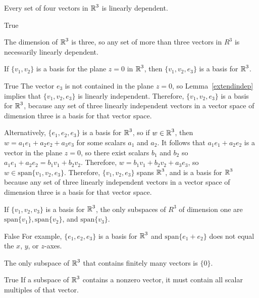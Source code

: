 \documentclass{ximera}
\begin{document}
\begin{exercise}  \label{A5.6.5}
Every set of four vectors in $\mbox{$\Bbb{R}$}^3$ is linearly dependent.
\begin{solution}
\ans True

\soln
The dimension of $\mbox{$\Bbb{R}$}^3$ is three, so any set of more than three vectors in $R^3$ is necessarily linearly dependent.
\end{solution}
\end{exercise}

\begin{exercise}  \label{A5.6.6}
If $\{v_1,v_2\}$ is a basis for the plane $z = 0$ in $\mbox{$\Bbb{R}$}^3$, then $\{v_1,v_2,e_3\}$ is a basis for $\mbox{$\Bbb{R}$}^3$.
\begin{solution}
\ans True
\soln
The vector $e_3$ is not contained in the plane $z=0$, so Lemma~\ref{extendindep} implies that $\{v_1,v_2,e_3\}$  is linearly independent. Therefore, $\{v_1,v_2,e_3\}$  is a basis for $\mbox{$\Bbb{R}$}^3$, because any set of three linearly independent vectors in a vector space of dimension three is a basis for that vector space. 

Alternatively, $\{e_1,e_2,e_3\}$ is a basis for $\mbox{$\Bbb{R}$}^3$, so if $w\in \mbox{$\Bbb{R}$}^3$, then $w = a_1 e_1 +a_2 e_2 +a_3 e_3$ for some scalars $a_1$ and $a_2$. It follows that $a_1 e_1 + a_2 e_2$ is a vector in the plane $z=0$, so there exist scalars $b_1$ and $b_2$ so $a_1 e_1+ a_2 e_2 = b_1 v_1 +b_2 v_2$. Therefore, $w = b_1 v_1 + b_2 v_2 + a_3 e_3$, so $w\in \text{span}\{v_1,v_2,e_3\}$. Therefore, $\{v_1,v_2,e_3\}$ spans $\mbox{$\Bbb{R}$}^3$, and is a basis for $\mbox{$\Bbb{R}$}^3$ because any set of three linearly independent vectors in a vector space of dimension three is a basis for that vector space. 
\end{solution}
\end{exercise}

\begin{exercise}  \label{A5.6.7}
If $\{v_1,v_2,v_3\}$ is a basis for $\mbox{$\Bbb{R}$}^3$, the only subspaces of $R^3$ of dimension one are $\text{span}\{v_1\}, \text{span}\{v_2\}$, and $\text{span}\{v_3\}$. 
\begin{solution}
\ans False 
\soln For example, $\{e_1,e_2,e_3\}$ is a basis for $\mbox{$\Bbb{R}$}^3$ and $\text{span}\{e_1+e_2\}$ does not equal the $x$, $y$, or $z$-axes.
\end{solution}
\end{exercise}

\begin{exercise}  \label{A5.6.8}
The only subspace of $\mbox{$\Bbb{R}$}^3$ that contains finitely many vectors is $\{ 0 \}$.
\begin{solution}
\ans True
\soln If a subspace of $\mbox{$\Bbb{R}$}^3$ contains a nonzero vector, it must contain all scalar multiples of that vector.
\end{solution}
\end{exercise}
\end{document}
